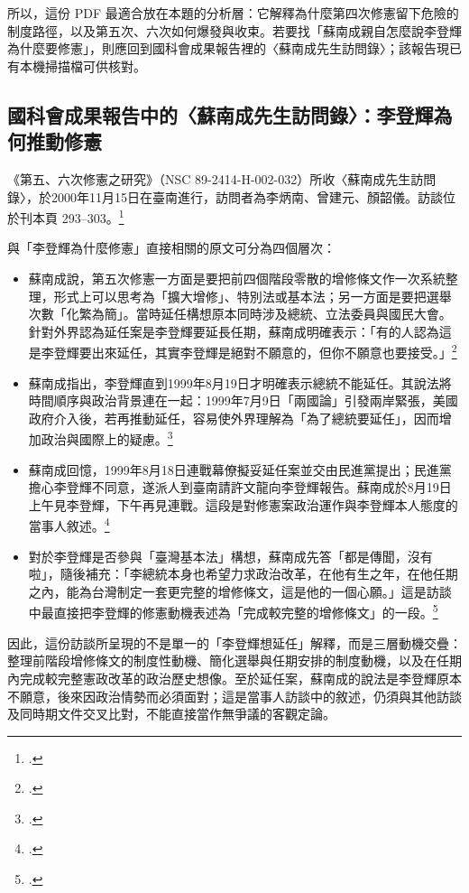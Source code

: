 所以，這份 PDF 最適合放在本題的分析層：它解釋為什麼第四次修憲留下危險的制度路徑，以及第五次、六次如何爆發與收束。若要找「蘇南成親自怎麼說李登輝為什麼要修憲」，則應回到國科會成果報告裡的〈蘇南成先生訪問錄〉；該報告現已有本機掃描檔可供核對。

\subsection{國科會成果報告中的〈蘇南成先生訪問錄〉：李登輝為何推動修憲}

《第五、六次修憲之研究》（NSC 89-2414-H-002-032）所收〈蘇南成先生訪問錄〉，於2000年11月15日在臺南進行，訪問者為李炳南、曾建元、顏韶儀。訪談位於刊本頁 293--303。\footcite[頁 293--303]{su2000interview}

與「李登輝為什麼修憲」直接相關的原文可分為四個層次：

\begin{itemize}
\tightlist
\item
  蘇南成說，第五次修憲一方面是要把前四個階段零散的增修條文作一次系統整理，形式上可以思考為「擴大增修」、特別法或基本法；另一方面是要把選舉次數「化繁為簡」。當時延任構想原本同時涉及總統、立法委員與國民大會。針對外界認為延任案是李登輝要延長任期，蘇南成明確表示：「有的人認為這是李登輝要出來延任，其實李登輝是絕對不願意的，但你不願意也要接受。」\footcite[頁 295--296]{su2000interview}
\item
  蘇南成指出，李登輝直到1999年8月19日才明確表示總統不能延任。其說法將時間順序與政治背景連在一起：1999年7月9日「兩國論」引發兩岸緊張，美國政府介入後，若再推動延任，容易使外界理解為「為了總統要延任」，因而增加政治與國際上的疑慮。\footcite[頁 297]{su2000interview}
\item
  蘇南成回憶，1999年8月18日連戰幕僚擬妥延任案並交由民進黨提出；民進黨擔心李登輝不同意，遂派人到臺南請許文龍向李登輝報告。蘇南成於8月19日上午見李登輝，下午再見連戰。這段是對修憲案政治運作與李登輝本人態度的當事人敘述。\footcite[頁 300]{su2000interview}
\item
  對於李登輝是否參與「臺灣基本法」構想，蘇南成先答「都是傳聞，沒有啦」，隨後補充：「李總統本身也希望力求政治改革，在他有生之年，在他任期之內，能為台灣制定一套更完整的增修條文，這是他的一個心願。」這是訪談中最直接把李登輝的修憲動機表述為「完成較完整的增修條文」的一段。\footcite[頁 301]{su2000interview}
\end{itemize}

因此，這份訪談所呈現的不是單一的「李登輝想延任」解釋，而是三層動機交疊：整理前階段增修條文的制度性動機、簡化選舉與任期安排的制度動機，以及在任期內完成較完整憲政改革的政治歷史想像。至於延任案，蘇南成的說法是李登輝原本不願意，後來因政治情勢而必須面對；這是當事人訪談中的敘述，仍須與其他訪談及同時期文件交叉比對，不能直接當作無爭議的客觀定論。

